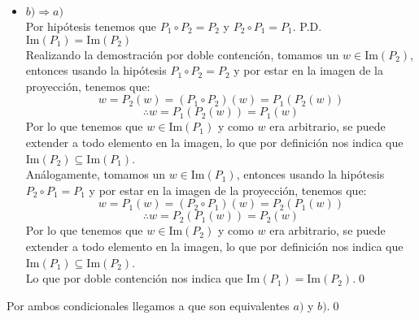 \begin{itemize}
    \item $b)\Longrightarrow a)$\\
    Por hip\'otesis tenemos que $P_1 \circ P_2 = P_2$ y $P_2 \circ P_1 = P_1$. P.D. $\text{Im}(P_1) = \text{Im}(P_2)$\\
    Realizando la demostraci\'on por doble contenci\'on, tomamos un $w\in \text{Im}(P_2)$, entonces usando la hip\'otesis $P_1 \circ P_2 = P_2$ y por estar en la imagen de la proyecci\'on, tenemos que:
    \[w=P_2(w)=(P_1 \circ P_2)(w)= P_1(P_2(w))\]
    \[\therefore w=P_1(P_2(w))=P_1(w)\]
    Por lo que tenemos que $w\in \text{Im}(P_1)$ y como $w$ era arbitrario, se puede extender a todo elemento en la imagen, lo que por definici\'on nos indica que $\text{Im}(P_2)\subseteq \text{Im}(P_1)$.\\
    An\'alogamente, tomamos un $w\in \text{Im}(P_1)$, entonces usando la hip\'otesis $P_2 \circ P_1 = P_1$ y por estar en la imagen de la proyecci\'on, tenemos que:
    \[w=P_1(w)=(P_2 \circ P_1)(w)= P_2(P_1(w))\]
    \[\therefore w=P_2(P_1(w))=P_2(w)\]
    Por lo que tenemos que $w\in \text{Im}(P_2)$ y como $w$ era arbitrario, se puede extender a todo elemento en la imagen, lo que por definici\'on nos indica que $\text{Im}(P_1)\subseteq \text{Im}(P_2)$.\\
    Lo que por doble contenci\'on nos indica que $\text{Im}(P_1) = \text{Im}(P_2)$.\qed
\end{itemize}
Por ambos condicionales llegamos a que son equivalentes $a)$ y $b)$.\qed